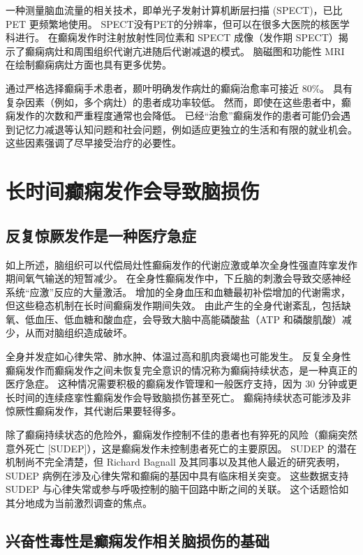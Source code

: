 一种测量脑血流量的相关技术，即单光子发射计算机断层扫描 (SPECT)，已比 PET 更频繁地使用。
SPECT没有PET的分辨率，但可以在很多大医院的核医学科进行。
在癫痫发作时注射放射性同位素和 SPECT 成像（发作期 SPECT）揭示了癫痫病灶和周围组织代谢亢进随后代谢减退的模式。
脑磁图和功能性 MRI 在绘制癫痫病灶方面也具有更多优势。


通过严格选择癫痫手术患者，颞叶明确发作病灶的癫痫治愈率可接近 80\%。
具有复杂因素（例如，多个病灶）的患者成功率较低。
然而，即使在这些患者中，癫痫发作的次数和严重程度通常也会降低。
已经“治愈”癫痫发作的患者可能仍会遇到记忆力减退等认知问题和社会问题，例如适应更独立的生活和有限的就业机会。
这些因素强调了尽早接受治疗的必要性。



\section{长时间癫痫发作会导致脑损伤}

\subsection{反复惊厥发作是一种医疗急症}

如上所述，脑组织可以代偿局灶性癫痫发作的代谢应激或单次全身性强直阵挛发作期间氧气输送的短暂减少。
在全身性癫痫发作中，下丘脑的刺激会导致交感神经系统“应激”反应的大量激活。
增加的全身血压和血糖最初补偿增加的代谢需求，但这些稳态机制在长时间癫痫发作期间失效。
由此产生的全身代谢紊乱，包括缺氧、低血压、低血糖和酸血症，会导致大脑中高能磷酸盐（ATP 和磷酸肌酸）减少，从而对脑组织造成破坏。


全身并发症如心律失常、肺水肿、体温过高和肌肉衰竭也可能发生。
反复全身性癫痫发作而癫痫发作之间未恢复完全意识的情况称为癫痫持续状态，是一种真正的医疗急症。
这种情况需要积极的癫痫发作管理和一般医疗支持，因为 30 分钟或更长时间的连续痉挛性癫痫发作会导致脑损伤甚至死亡。
癫痫持续状态可能涉及非惊厥性癫痫发作，其代谢后果要轻得多。


除了癫痫持续状态的危险外，癫痫发作控制不佳的患者也有猝死的风险（癫痫突然意外死亡 [SUDEP]），这是癫痫发作未控制患者死亡的主要原因。
SUDEP 的潜在机制尚不完全清楚，但 Richard Bagnall 及其同事以及其他人最近的研究表明，SUDEP 病例在涉及心律失常和癫痫的基因中具有临床相关突变。
这些数据支持 SUDEP 与心律失常或参与呼吸控制的脑干回路中断之间的关联。
这个话题恰如其分地成为当前激烈调查的焦点。



\subsection{兴奋性毒性是癫痫发作相关脑损伤的基础}

